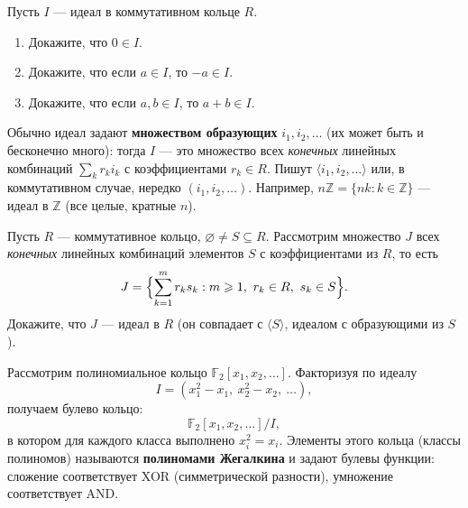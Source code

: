 \documentclass[11pt, a4paper]{extarticle}
\renewcommand{\ge}{\geqslant}
\begin{document}
\begin{exercise}
Пусть $I$ --- идеал в коммутативном кольце $R$.
\begin{enumerate}
    \item Докажите, что $0\in I$.
    \item Докажите, что если $a\in I$, то $-a\in I$.
    \item Докажите, что если $a,b\in I$, то $a+b\in I$.
\end{enumerate}
\end{exercise}

Обычно идеал задают \textbf{множеством образующих} $i_1, i_2, \dots$ (их может быть и бесконечно много): тогда $I$ --- это множество всех \emph{конечных} линейных комбинаций $\sum_k r_k i_k$ с коэффициентами $r_k\in R$. Пишут $\langle i_1, i_2, \dots\rangle$ или, в коммутативном случае, нередко $(i_1, i_2, \dots)$. Например, $n\mathbb{Z} = \{nk : k\in\mathbb{Z}\}$ --- идеал в $\mathbb{Z}$ (все целые, кратные $n$).

\begin{exercise}
Пусть $R$ --- коммутативное кольцо, $\varnothing \neq S \subseteq R$. Рассмотрим множество $J$ всех \emph{конечных} линейных комбинаций элементов $S$ с коэффициентами из $R$, то есть
$$
J = \Bigl\{ \sum_{k=1}^m r_k s_k : m\ge 1,\ r_k\in R,\ s_k\in S \Bigr\}.
$$
Докажите, что $J$ --- идеал в $R$ (он совпадает с $\langle S\rangle$, идеалом с образующими из $S$).
\end{exercise}

\begin{theorem}
Рассмотрим полиномиальное кольцо $\mathbb{F}_2[x_1,x_2,\dots]$. Факторизуя по идеалу
$$
I = (x_1^2-x_1,\ x_2^2-x_2,\ \dots),
$$
получаем булево кольцо:
$$
\mathbb{F}_2[x_1,x_2,\dots]/I,
$$
в котором для каждого класса выполнено $x_i^2 = x_i$. Элементы этого кольца (классы полиномов) называются \textbf{полиномами Жегалкина} и задают булевы функции: сложение соответствует XOR (симметрической разности), умножение соответствует AND.
\end{theorem}
\end{document}
